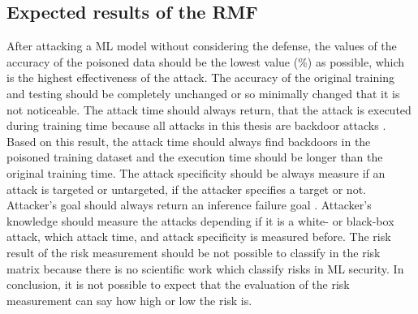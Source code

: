 \subsection{Expected results of the RMF}

After attacking a ML model without considering the defense, the values of the accuracy of the poisoned data should be the lowest value (\%) as possible, which is the highest effectiveness of the attack. The accuracy of the original training and testing should be completely unchanged or so minimally changed that it is not noticeable. The attack time should always return, that the attack is executed during training time because all attacks in this thesis are backdoor attacks \cite{DBLP:journals/tr/UdeshiPWLRC22}. Based on this result, the attack time should always find backdoors in the poisoned training dataset and the execution time should be longer than the original training time. The attack specificity should be always measure if an attack is targeted or untargeted, if the attacker specifies a target or not. Attacker's goal should always return an inference failure goal \cite{DBLP:journals/corr/abs-2012-04884}. Attacker's knowledge should measure the attacks depending if it is a white- or black-box attack, which attack time, and attack specificity is measured before. The risk result of the risk measurement should be not possible to classify in the risk matrix because there is no scientific work which classify risks in ML security. In conclusion, it is not possible to expect that the evaluation of the risk measurement can say how high or low the risk is.
